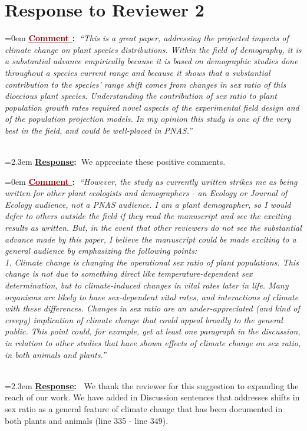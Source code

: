 \documentclass[12pt]{article}
\newcounter{cN}
\newcommand{\comment}[1]{
	\vspace{2em}
	\refstepcounter{cN} %
	\noindent \hangindent=0em \textbf{\textcolor{Maroon}{\uline{Comment \thecN}:~}}\emph{``#1''}
	}
\newcommand{\response}[1]{
	\\[0.25em]
	\hangindent=2.3em \textbf{\textcolor{NavyBlue}{\uline{Response}:~}}#1
	}
\begin{document}
\section{Response to Reviewer 2}
\vspace{-2em}

\comment{This is a great paper, addressing the projected impacts of climate change on plant species distributions. Within the field of demography, it is a substantial advance empirically because it is based on demographic studies done throughout a species current range and because it shows that a substantial contribution to the species' range shift comes from changes in sex ratio of this dioecious plant species. Understanding the contribution of sex ratio to plant population growth rates required novel aspects of the experimental field design and of the population projection models. In my opinion this study is one of the very best in the field, and could be well-placed in PNAS.}
\response{We  appreciate these positive comments.}

\comment{However, the study as currently written strikes me as being written for other plant ecologists and demographers - an Ecology or Journal of Ecology audience, not a PNAS audience. I am a plant demographer, so I would defer to others outside the field if they read the manuscript and see the exciting results as written. But, in the event that other reviewers do not see the substantial advance made by this paper, I believe the manuscript could be made exciting to a general audience by emphasizing the following points:
\\
1. Climate change is changing the operational sex ratio of plant populations. This change is not due to something direct like temperature-dependent sex determination, but to climate-induced changes in vital rates later in life. Many organisms are likely to have sex-dependent vital rates, and interactions of climate with these differences. Changes in sex ratio are an under-appreciated (and kind of creepy) implication of climate change that could appeal broadly to the general public. This point could, for example, get at least one paragraph in the discussion, in relation to other studies that have shown effects of climate change on sex ratio, in both animals and plants.}
\response{ We thank the reviewer for this suggestion to expanding the reach of our work. We have added in Discussion sentences that addresses shifts in sex ratio as a general feature of climate change that has been documented in both plants and animals (line 335 - line 349).
}
\end{document}
